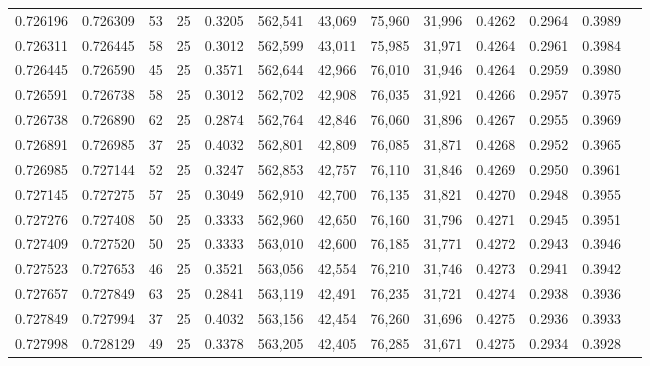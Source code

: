 \begin{tabular}{rrrrrrrrrrrrr}
0.726196 & 0.726309 &    53 &  25 &                                     0.3205 & 562,541 &  43,069 &  75,960 &  31,996 & 0.4262 & 0.2964 & 0.3989 \\
0.726311 & 0.726445 &    58 &  25 &                                     0.3012 & 562,599 &  43,011 &  75,985 &  31,971 & 0.4264 & 0.2961 & 0.3984 \\
0.726445 & 0.726590 &    45 &  25 &                                     0.3571 & 562,644 &  42,966 &  76,010 &  31,946 & 0.4264 & 0.2959 & 0.3980 \\
0.726591 & 0.726738 &    58 &  25 &                                     0.3012 & 562,702 &  42,908 &  76,035 &  31,921 & 0.4266 & 0.2957 & 0.3975 \\
0.726738 & 0.726890 &    62 &  25 &                                     0.2874 & 562,764 &  42,846 &  76,060 &  31,896 & 0.4267 & 0.2955 & 0.3969 \\
0.726891 & 0.726985 &    37 &  25 &                                     0.4032 & 562,801 &  42,809 &  76,085 &  31,871 & 0.4268 & 0.2952 & 0.3965 \\
0.726985 & 0.727144 &    52 &  25 &                                     0.3247 & 562,853 &  42,757 &  76,110 &  31,846 & 0.4269 & 0.2950 & 0.3961 \\
0.727145 & 0.727275 &    57 &  25 &                                     0.3049 & 562,910 &  42,700 &  76,135 &  31,821 & 0.4270 & 0.2948 & 0.3955 \\
0.727276 & 0.727408 &    50 &  25 &                                     0.3333 & 562,960 &  42,650 &  76,160 &  31,796 & 0.4271 & 0.2945 & 0.3951 \\
0.727409 & 0.727520 &    50 &  25 &                                     0.3333 & 563,010 &  42,600 &  76,185 &  31,771 & 0.4272 & 0.2943 & 0.3946 \\
0.727523 & 0.727653 &    46 &  25 &                                     0.3521 & 563,056 &  42,554 &  76,210 &  31,746 & 0.4273 & 0.2941 & 0.3942 \\
0.727657 & 0.727849 &    63 &  25 &                                     0.2841 & 563,119 &  42,491 &  76,235 &  31,721 & 0.4274 & 0.2938 & 0.3936 \\
0.727849 & 0.727994 &    37 &  25 &                                     0.4032 & 563,156 &  42,454 &  76,260 &  31,696 & 0.4275 & 0.2936 & 0.3933 \\
0.727998 & 0.728129 &    49 &  25 &                                     0.3378 & 563,205 &  42,405 &  76,285 &  31,671 & 0.4275 & 0.2934 & 0.3928 \\

\end{tabular}
